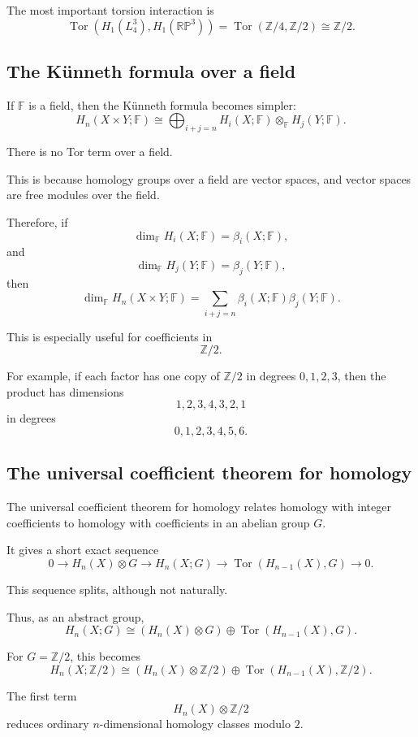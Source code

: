 \documentclass[12pt,a4paper]{article}
\theoremstyle{notespace}
\begin{document}
The most important torsion interaction is
\[
\operatorname{Tor}(H_1(L_4^3),H_1(\mathbb{RP}^3))
=
\operatorname{Tor}(\mathbb Z/4,\mathbb Z/2)
\cong
\mathbb Z/2.
\]

\subsection{The Künneth formula over a field}

If \(\mathbb F\) is a field, then the Künneth formula becomes simpler:
\[
H_n(X\times Y;\mathbb F)
\cong
\bigoplus_{i+j=n}
H_i(X;\mathbb F)\otimes_{\mathbb F}H_j(Y;\mathbb F).
\]

There is no Tor term over a field.

This is because homology groups over a field are vector spaces, and vector spaces are free modules over the field.

Therefore, if
\[
\dim_{\mathbb F}H_i(X;\mathbb F)=\beta_i(X;\mathbb F),
\]
and
\[
\dim_{\mathbb F}H_j(Y;\mathbb F)=\beta_j(Y;\mathbb F),
\]
then
\[
\dim_{\mathbb F}H_n(X\times Y;\mathbb F)
=
\sum_{i+j=n}
\beta_i(X;\mathbb F)\beta_j(Y;\mathbb F).
\]

This is especially useful for coefficients in
\[
\mathbb Z/2.
\]

For example, if each factor has one copy of \(\mathbb Z/2\) in degrees \(0,1,2,3\), then the product has dimensions
\[
1,2,3,4,3,2,1
\]
in degrees
\[
0,1,2,3,4,5,6.
\]

\subsection{The universal coefficient theorem for homology}

The universal coefficient theorem for homology relates homology with integer coefficients to homology with coefficients in an abelian group \(G\).

It gives a short exact sequence
\[
0
\longrightarrow
H_n(X)\otimes G
\longrightarrow
H_n(X;G)
\longrightarrow
\operatorname{Tor}(H_{n-1}(X),G)
\longrightarrow
0.
\]

This sequence splits, although not naturally.

Thus, as an abstract group,
\[
H_n(X;G)
\cong
(H_n(X)\otimes G)
\oplus
\operatorname{Tor}(H_{n-1}(X),G).
\]

For \(G=\mathbb Z/2\), this becomes
\[
H_n(X;\mathbb Z/2)
\cong
(H_n(X)\otimes \mathbb Z/2)
\oplus
\operatorname{Tor}(H_{n-1}(X),\mathbb Z/2).
\]

The first term
\[
H_n(X)\otimes \mathbb Z/2
\]
reduces ordinary \(n\)-dimensional homology classes modulo \(2\).
\end{document}
